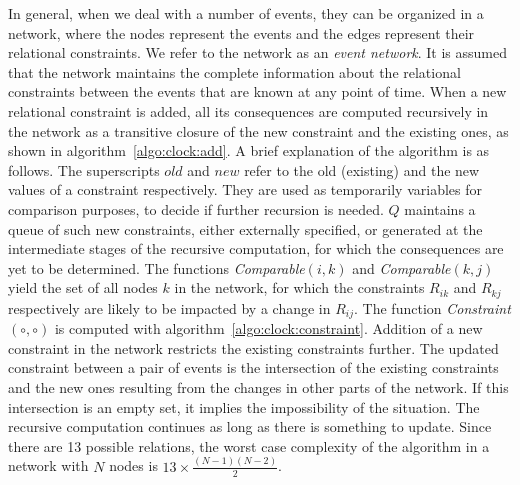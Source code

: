 
In general, when we deal with a number of events, they can be organized in a network, where the nodes represent the events and the 
edges represent their relational constraints. We refer to the network as an {\em event network}. It is assumed that the network maintains 
the complete information about the relational constraints between the events that are known at any point of time. When a new relational 
constraint is added, all its consequences are computed recursively in the network as a transitive closure of the new constraint and the 
existing ones, as shown in algorithm~\ref{algo:clock:add}. 
%
A brief explanation of the algorithm is as follows. The superscripts $old$ and $new$ refer to the old (existing) and the new 
values of a constraint respectively. They are used as temporarily variables for comparison purposes, to decide if further recursion 
is needed. $Q$ maintains a queue of such new constraints, either externally specified, or generated at the intermediate stages of the 
recursive computation, for which the consequences are yet to be determined. The functions {\em Comparable$(i,k)$} and {\em Comparable$(k,j)$}
yield the set of all nodes $k$ in the network, for which the constraints $R_{ik}$ and $R_{kj}$ respectively are likely to be impacted by 
a change in $R_{ij}$. The function {\em Constraint$(\circ, \circ)$} is computed with algorithm~\ref{algo:clock:constraint}.
%
Addition of a new constraint in the network restricts the existing constraints further. The updated constraint between a pair of 
events is the intersection of the existing constraints and the new ones resulting from the changes in other parts of the network.
If this intersection is an empty set, it implies the impossibility of the situation.
The recursive computation continues as long as there is something to update. Since there are 13 possible relations, the worst case 
complexity of the algorithm in a network with $N$ nodes is $13 \times \frac{(N-1)(N-2)}{2}$.

